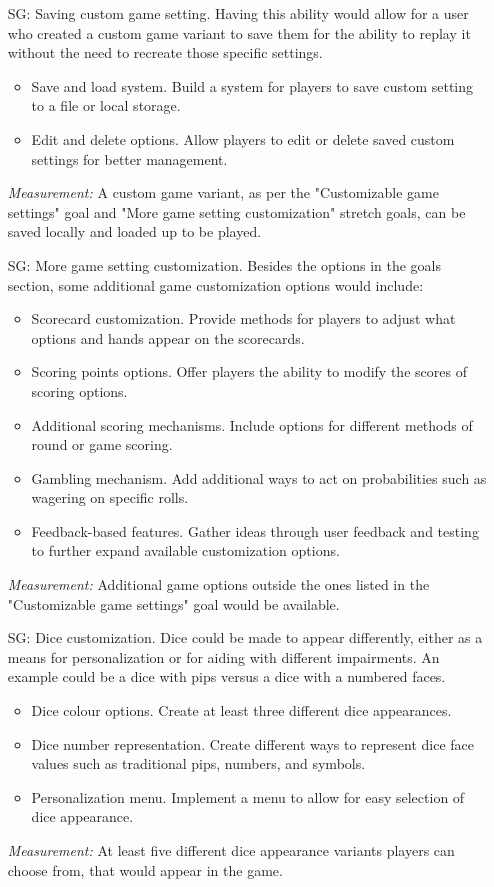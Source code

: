 \begin{itemize}
	\item[SG\refstepcounter{goalnum}\thegoalnum \label{G_saving}:] Saving custom game setting. Having this ability would allow for a user who created a custom game variant to save them for the ability to replay it without the need to recreate those specific settings.
	\begin{itemize}
        \item Save and load system. Build a system for players to save custom setting to a file or local storage.
        \item Edit and delete options. Allow players to edit or delete saved custom settings for better management.
    \end{itemize}
	\textit{Measurement:} A custom game variant, as per the "Customizable game settings" goal and "More game setting customization" stretch goals, can be saved locally and loaded up to be played.
	
	\item[SG\refstepcounter{goalnum}\thegoalnum \label{G_customization2}:] More game setting customization. Besides the options in the goals section, some additional game customization options would include:
	\begin{itemize}
        \item Scorecard customization. Provide methods for players to adjust what options and hands appear on the scorecards.
        \item Scoring points options. Offer players the ability to modify the scores of scoring options.
        \item Additional scoring mechanisms. Include options for different methods of round or game scoring.
        \item Gambling mechanism. Add additional ways to act on probabilities such as wagering on specific rolls.
        \item Feedback-based features. Gather ideas through user feedback and testing to further expand available customization options.
    \end{itemize}
	\textit{Measurement:} Additional game options outside the ones listed in the "Customizable game settings" goal would be available.

	\item[SG\refstepcounter{goalnum}\thegoalnum \label{G_skins}:] Dice customization. Dice could be made to appear differently, either as a means for personalization or for aiding with different impairments. An example could be a dice with pips versus a dice with a numbered faces.
	\begin{itemize}
        \item Dice colour options. Create at least three different dice appearances.
        \item Dice number representation. Create different ways to represent dice face values such as traditional pips, numbers, and symbols.
        \item Personalization menu. Implement a menu to allow for easy selection of dice appearance.
    \end{itemize}
	\textit{Measurement:} At least five different dice appearance variants players can choose from, that would appear in the game.
	

\end{itemize}
